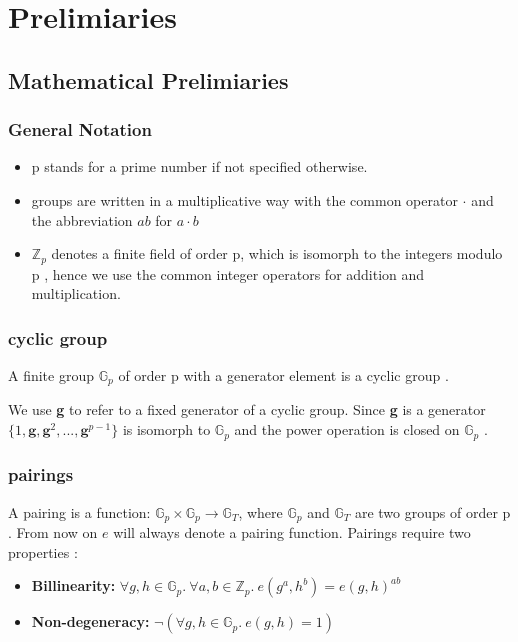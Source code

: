 \chapter{Prelimiaries}\label{chapter:prelimiaries}

\theoremstyle{definition}
\newtheorem{definition}{Definition}[section]

\section{Mathematical Prelimiaries}

\subsection{General Notation}
\begin{itemize}
    \item p stands for a prime number if not specified otherwise.
    \item groups are written in a multiplicative way with the common operator $\cdot$ and the abbreviation $ab$ for $a \cdot b$
    \item $\mathbb{Z}_p$ denotes a finite field of order p, which is isomorph to the integers modulo p \parencite{algebra}, hence we use the common integer operators for addition and multiplication. 
\end{itemize}


\subsection{cyclic group}
A finite group $\mathbb{G}_p$ of order p with a generator element is a cyclic group \parencite{algebra}.

We use \textbf{g} to refer to a fixed generator of a cyclic group. Since \textbf{g} is a generator
$\{1,\textbf{g},\textbf{g}^2,...,\textbf{g}^{p-1}\}$ is isomorph to $\mathbb{G}_p$ and the power operation is closed on $\mathbb{G}_p$ \parencite{algebra}.


\subsection{pairings}
A pairing is a function: $\mathbb{G}_p \times \mathbb{G}_p \rightarrow \mathbb{G}_T$, where $\mathbb{G}_p$ and $\mathbb{G}_T$ are two groups of order p \parencite{KZG}. From now on $e$ will always denote a pairing function.
Pairings require two properties \parencite{KZG}:
\begin{itemize}
    \item \textbf{Billinearity:} $\forall g,h \in \mathbb{G}_p.\ \forall a,b \in \mathbb{Z}_p.\ e(g^a,h^b) = e(g,h) ^{ab}$
    \item \textbf{Non-degeneracy:} $\neg (\forall g,h  \in \mathbb{G}_p.\  e(g,h) = 1)$
\end{itemize}
  
